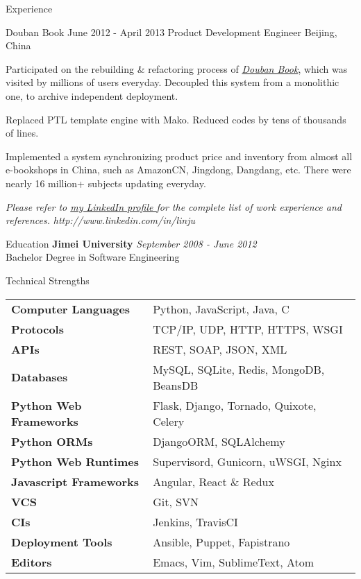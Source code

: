 \documentclass{resume}
\begin{document}
\begin{rSection}{Experience}
    \begin{rSubsection}{Douban Book}{ June 2012 - April 2013 }{ Product Development Engineer }{Beijing, China}
    \item Participated on the rebuilding \& refactoring process of \href{book.douban.com}{\textit {Douban Book}}, which was visited by millions of users everyday. Decoupled this system from a monolithic one, to archive independent deployment.
    \item Replaced PTL template engine with Mako.  Reduced codes by tens of thousands of lines.
    \item Implemented a system synchronizing product price and inventory from almost all e-bookshops in China, such as AmazonCN, Jingdong, Dangdang, etc. There were nearly 16 million+ subjects updating everyday.
    \end{rSubsection}

  \end{rSection}

  \begin{center}
  \textit{ Please refer to \href{http://www.linkedin.com/in/linju}{ my LinkedIn profile } for the complete list of work experience and references.}
  \textit{ http://www.linkedin.com/in/linju }
  \end{center}

  \newpage

  \begin{rSection}{Education}
    { \bf Jimei University  } \hfill {\em September 2008 - June 2012 } \\
    { Bachelor Degree in Software Engineering } \\
  \end{rSection}

  \begin{rSection}{Technical Strengths}
    \begin{tabular}{ @{} >{\bfseries}l @{\hspace{6ex}} l }
      Computer Languages & Python, JavaScript, Java, C \\
      Protocols & TCP/IP, UDP, HTTP, HTTPS, WSGI \\
      APIs & REST, SOAP, JSON, XML \\
      Databases & MySQL, SQLite, Redis, MongoDB, BeansDB \\
      Python Web Frameworks & Flask, Django, Tornado, Quixote, Celery \\
      Python ORMs & DjangoORM, SQLAlchemy \\
      Python Web Runtimes & Supervisord, Gunicorn, uWSGI, Nginx \\
      Javascript Frameworks & Angular, React \& Redux \\
      VCS & Git, SVN \\
      CIs & Jenkins, TravisCI \\
      Deployment Tools & Ansible, Puppet, Fapistrano \\
      Editors & Emacs, Vim, SublimeText, Atom \\
    \end{tabular}
  \end{rSection}
\end{document}
